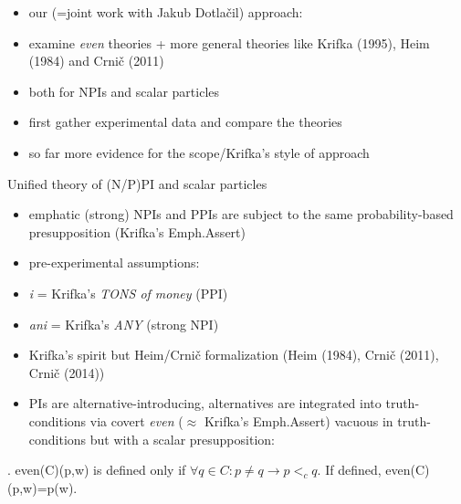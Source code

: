 \documentclass[ignorenonframetext,]{beamer}
\providecommand{\tightlist}{%
  \setlength{\itemsep}{0pt}\setlength{\parskip}{0pt}}
\begin{document}
\begin{frame}

\begin{itemize}
\tightlist
\item
  our (=joint work with Jakub Dotlačil) approach:
\item
  examine \emph{even} theories + more general theories like Krifka
  (1995), Heim (1984) and Crnič (2011)
\item
  both for NPIs and scalar particles
\item
  first gather experimental data and compare the theories
\item
  so far more evidence for the scope/Krifka's style of approach
\end{itemize}

\end{frame}

\begin{frame}{Unified theory of (N/P)PI and scalar particles}


\begin{itemize}
\tightlist
\item
  emphatic (strong) NPIs and PPIs are subject to the same
  probability-based presupposition (Krifka's Emph.Assert)
\item
  pre-experimental assumptions:
\item
  \emph{i} = Krifka's \emph{TONS of money} (PPI)
\item
  \emph{ani} = Krifka's \emph{ANY} (strong NPI)
\end{itemize}
\end{frame}

\begin{frame}
\begin{itemize}

\item Krifka's spirit but Heim/Crnič formalization (Heim (1984), Crnič (2011),
Crnič (2014))

\tightlist
\item
  PIs are alternative-introducing,
  alternatives are integrated into truth-conditions via covert
  \emph{even} (\(\approx\) Krifka's Emph.Assert) vacuous in truth-conditions but with a scalar presupposition: 
\end{itemize}

\ex. even(C)(p,w) is defined only if
\(\forall q \in C: p \neq q \rightarrow p <_c q\). If defined,
even(C)(p,w)=p(w).

\end{frame}
\end{document}
